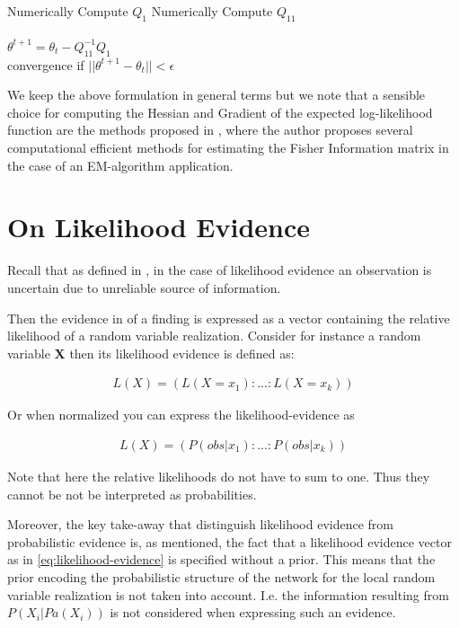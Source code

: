 \documentclass[11pt]{article}
\begin{document}
\begin{article}
\begin{algorithm*}[h!]
\begin{multicols}{2}
\begin{algorithmic}[1]
   \State Numerically Compute $Q_1$
   \State Numerically Compute $Q_{11}$\\

   \\
      \State $\theta^{t+1}= \theta_{t} - Q_{11}^{-1} Q_1$\\
      \State convergence if $||\theta^{t+1} - \theta_{t}|| < \epsilon$
   \EndForAll
\end{algorithmic}
\end{multicols}
\end{algorithm*}

We keep the above formulation in general terms but we note that a
sensible choice for computing the Hessian and Gradient of the
expected log-likelihood function are the methods proposed in
\cite{meng2016method}, where the author proposes several
computational efficient methods for estimating the Fisher
Information matrix in the case of an EM-algorithm application. 

\newpage

\section{On Likelihood Evidence}
\label{likelihood-em}
Recall that as defined in \cite{Mrad_2015}, in the case of
likelihood evidence an observation is uncertain due to unreliable
source of information.

Then the evidence in of a finding is expressed as a vector
containing the relative likelihood of a random variable
realization. Consider for instance a random variable \textbf{X} then its
likelihood evidence is defined as:

\begin{align} \label{eq:likelihood-evidence}
 L(X) = (L(X = x_1): ... : L(X = x_k))
\end{align}

Or when normalized you can express the likelihood-evidence as 

\begin{align} \label{eq:normalized-likelihood-evidence}
 L(X) = (P(obs | x_1): ... : P(obs | x_k))
\end{align}

Note that here the relative likelihoods do not have to sum to
one. Thus they cannot be not be interpreted as probabilities.

Moreover, the key take-away that distinguish likelihood evidence
from probabilistic evidence is, as mentioned, the fact that a
likelihood evidence vector as in \ref{eq:likelihood-evidence} is
specified without a prior. This means that the prior encoding the
probabilistic structure of the network for the local random
variable realization is not taken into account. I.e. the
information resulting from \(P(X_i|Pa(X_i))\) is not considered when
expressing such an evidence.


\end{article}
\end{document}
